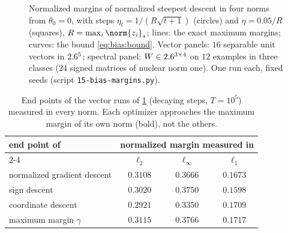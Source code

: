 \begin{refsection}
\begin{figure}[t]
\begin{fullwidth}
\par\vspace{1mm}
\end{fullwidth}
\caption{Normalized margins of normalized steepest descent in four norms from $\theta_0=0$, with steps $\eta_t=1/(R\sqrt{t+1})$ (circles) and $\eta=0.05/R$ (squares), $R=\max_i\norm{z_i}_*$; lines: the exact maximum margins; curves: the bound \eqref{eq:bias:bound}. Vector panels: $16$ separable unit vectors in $2.6^5$; spectral panel: $W\in2.6^{3\times4}$ on $12$ examples in three classes ($24$ signed matrices of nuclear norm one). One run each, fixed seeds (script \texttt{15-bias-margins.py}).}
\label{fig:bias:margins}
\end{figure}

\begin{table}[t]
\centering\small
\begin{tabular}{@{}lccc@{}}
\toprule
end point of & \multicolumn{3}{c}{normalized margin measured in} \\
\cmidrule(l){2-4}
 & $\ell_2$ & $\ell_\infty$ & $\ell_1$ \\
\midrule
normalized gradient descent & $\mathbf{0.3108}$ & $0.3666$ & $0.1673$\\
sign descent & $0.3020$ & $\mathbf{0.3750}$ & $0.1598$\\
coordinate descent & $0.2921$ & $0.3350$ & $\mathbf{0.1709}$\\
maximum margin $\gamma$ & $0.3115$ & $0.3766$ & $0.1717$\\
\bottomrule
\end{tabular}
\caption{End points of the vector runs of \cref{fig:bias:margins} (decaying steps, $T=10^5$) measured in every norm. Each optimizer approaches the maximum margin of its own norm (bold), not the others.}
\label{tab:bias:cross}
\end{table}


\end{refsection}
